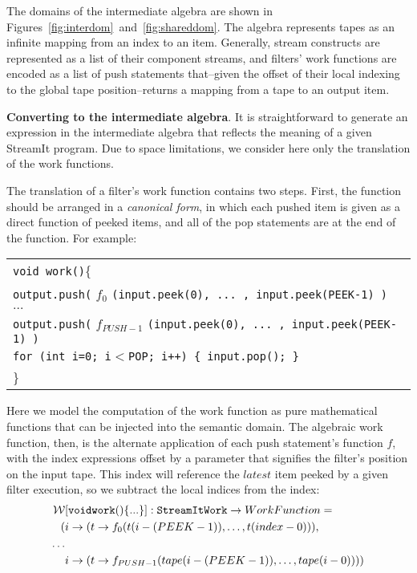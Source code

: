 The domains of the intermediate algebra are shown in
Figures~\ref{fig:interdom}~and~\ref{fig:shareddom}.  The algebra
represents tapes as an infinite mapping from an index to an item.
Generally, stream constructs are represented as a list of their
component streams, and filters' work functions are encoded as a list
of push statements that--given the offset of their local indexing to
the global tape position--returns a mapping from a tape to an output
item.

{\bf Converting to the intermediate algebra}.  It is straightforward
to generate an expression in the intermediate algebra that reflects
the meaning of a given StreamIt program.  Due to space limitations, we
consider here only the translation of the work functions.

The translation of a filter's work function contains two steps.
First, the function should be arranged in a {\it canonical form}, in
which each pushed item is given as a direct function of peeked items,
and all of the pop statements are at the end of the function.  For
example: \\
\vspace{0.2in}
\begin{scriptsize}
\begin{tabular}{l}
{\tt void work()}\{ \\
\hspace{12pt} {\tt output.push(} $f_0$ {\tt (input.peek(0), ... , input.peek(PEEK-1) )} \\
\hspace{12pt} $\dots$ \\
\hspace{12pt} {\tt output.push(} $f_{PUSH-1}$ {\tt (input.peek(0), ... , input.peek(PEEK-1) )} \\
\hspace{12pt} {\tt for (int i=0; i$<$POP; i++) \{ input.pop(); \}} \\
\}
\vspace{-12pt}
\end{tabular}
\end{scriptsize}
Here we model the computation of the work function as pure
mathematical functions that can be injected into the semantic domain.
The algebraic work function, then, is the alternate application of
each push statement's function $f$, with the index expressions offset
by a parameter that signifies the filter's position on the input tape.
This index will reference the $latest$ item peeked by a given filter
execution, so we subtract the local indices from the index:
\begin{align*}
{\cal W}&[{\tt void work() \{...\}}]: {\tt StreamIt Work} \ra
WorkFunction = \\
(&i \ra (t \ra f_0(t(i - (PEEK-1)), \dots , t(index -
0))), \\
\dots \\
&i \ra (t \ra f_{PUSH-1}(tape(i - (PEEK-1)), \dots , tape(i -
0))))
\end{align*}

